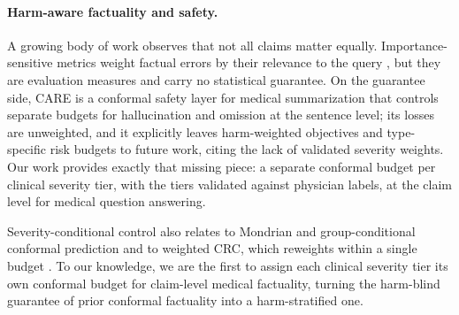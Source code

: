 \paragraph{Harm-aware factuality and safety.}
A growing body of work observes that not all claims matter equally.
Importance-sensitive metrics weight factual errors by their relevance to the
query \citep{wanner2025importance}, but they are evaluation measures and carry
no statistical guarantee. On the guarantee side, CARE \citep{bedi2026care} is a
conformal safety layer for medical summarization that controls separate budgets
for hallucination and omission at the sentence level; its losses are unweighted,
and it explicitly leaves harm-weighted objectives and type-specific risk budgets
to future work, citing the lack of validated severity weights. Our work provides
exactly that missing piece: a separate conformal budget per clinical severity
tier, with the tiers validated against physician labels, at the claim level for
medical question answering.

Severity-conditional control also relates to Mondrian and group-conditional
conformal prediction \citep{vovk2012conditional} and to weighted CRC, which
reweights within a single budget \citep{xu2024conformal}. To our knowledge, we
are the first to assign each clinical severity tier its own conformal budget for
claim-level medical factuality, turning the harm-blind guarantee of prior
conformal factuality into a harm-stratified one.
